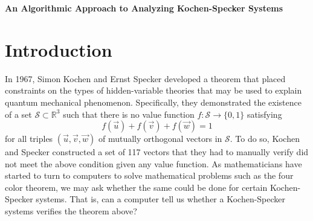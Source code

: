 \documentclass[11pt]{article}
\begin{document}
\pagestyle{fancy}

\lfoot{} 
\rfoot{}
\begin{center}
	{\Large\bf An Algorithmic Approach to Analyzing Kochen-Specker Systems}
\end{center}

\section{Introduction}
\hspace{\parindent}In 1967, Simon Kochen and Ernst Specker developed a theorem that placed constraints on the types of hidden-variable theories that may be used to explain quantum mechanical phenomenon. Specifically, they demonstrated the existence of a set $\mathcal{S} \subset \mathbb{R}^{3}$ such that there is no value function $f: \mathcal{S} \to \{0, 1\}$ satisfying
\[f(\vec{u}) + f(\vec{v}) + f(\vec{w}) = 1\]
for all triples $(\vec{u}, \vec{v}, \vec{w})$ of mutually orthogonal vectors in $\mathcal{S}$. To do so, Kochen and Specker constructed a set of 117 vectors that they had to manually verify did not meet the above condition given any value function. As mathematicians have started to turn to computers to solve mathematical problems such as the four color theorem, we may ask whether the same could be done for certain Kochen-Specker systems. That is, can a computer tell us whether a Kochen-Specker systems verifies the theorem above?
\end{document}
